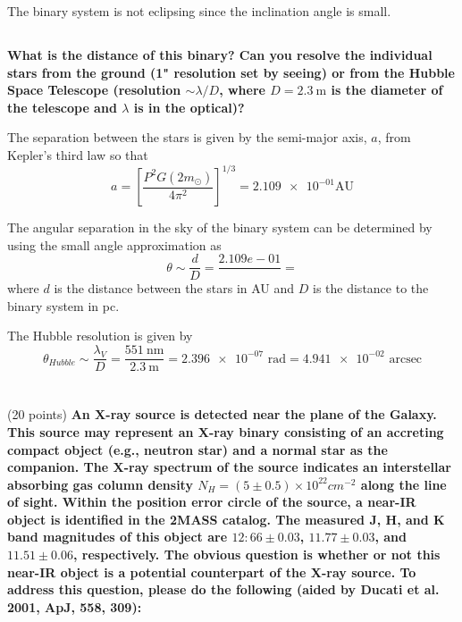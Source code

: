 The binary system is not eclipsing since the inclination angle is small.


\subsection{}
\textbf{What is the distance of this binary? 
Can you resolve the individual stars from the ground (1" resolution set by seeing) or from the Hubble Space Telescope (resolution $\sim\lambda/D$, where $D = \SI{2.3}{\m}$ is the diameter of the telescope and $\lambda$ is in the optical)?}

The separation between the stars is given by the semi-major axis, $a$, from Kepler's third law so that
\begin{equation*}
    a = \left[\frac{P^2G(2m_\odot)}{4\pi^2}\right]^{1/3} = \num{2.109e-01}\mathrm{AU} 
\end{equation*}

The angular separation in the sky of the binary system can be determined by using the small angle approximation as 
\begin{equation*}
    \theta\sim\frac{d}{D} = \frac{2.109e-01}{} = 
\end{equation*}
where $d$ is the distance between the stars in AU and $D$ is the distance to the binary system in pc.

The Hubble resolution is given by
\begin{equation*}
    \theta_{Hubble}\sim\frac{\lambda_V}{D} = \frac{\SI{551}{\nano\meter}}{\SI{2.3}{\meter}} = \num{2.396e-07}\text{ rad} = \num{4.941e-02}\text{ arcsec}
\end{equation*}



\section{}(20 points)
\textbf{An X-ray source is detected near the plane of the Galaxy. 
This source may represent an X-ray binary consisting of an accreting compact object (e.g., neutron star) and a normal star as the companion.
The X-ray spectrum of the source indicates an interstellar absorbing gas column density $N_H = (5 \pm 0.5) \times 10^{22} cm^{-2}$ along the line of sight.
Within the position error circle of the source, a near-IR object is identified in the 2MASS catalog.
The measured J, H, and K band magnitudes of this object are
$12:66\pm0.03$, $11.77\pm0.03$, and $11.51\pm0.06$, respectively.
The obvious question is whether or not this near-IR object is a potential counterpart of the X-ray source.
To address this question, please do the following (aided by Ducati et al. 2001, ApJ, 558, 309):}
